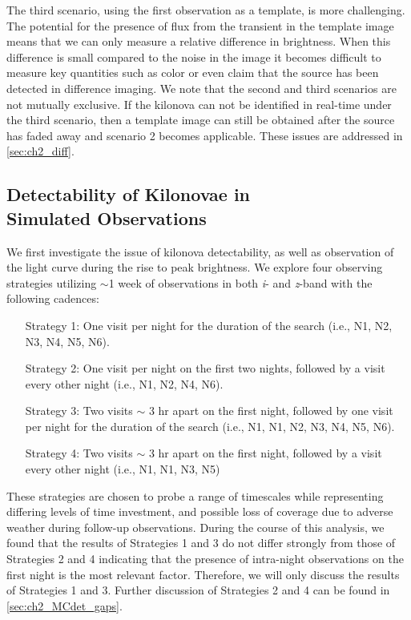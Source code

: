 The third scenario, using the first observation as a template, is more challenging. The potential for the presence of flux from the transient in the template image means that we can only measure a relative difference in brightness. When this difference is small compared to the noise in the image it becomes difficult to measure key quantities such as color or even claim that the source has been detected in difference imaging. We note that the second and third scenarios are not mutually exclusive. If the kilonova can not be identified in real-time under the third scenario, then a template image can still be obtained after the source has faded away and scenario 2 becomes applicable. These issues are addressed in \cref{sec:ch2_diff}.

\subsection{Detectability of Kilonovae in\\ Simulated Observations}
\label{sec:ch2_MCsims_det}
We first investigate the issue of kilonova detectability, as well as observation of the light curve during the rise to peak brightness. We explore four observing strategies utilizing $\sim$1 week of observations in both {\em i}- and {\em z}-band with the following cadences:
{\small \begin{enumerate}[leftmargin = 2.5cm]
\item[Strategy 1:] One visit per night for the duration of the search (i.e., N1, N2, N3, N4, N5, N6). 
\item[Strategy 2:]  One visit per night on the first two nights, followed by a visit every other night (i.e., N1, N2, N4, N6).
\item[Strategy 3:]  Two visits $\sim$ 3 hr apart on the first night, followed by one visit per night for the duration of the search (i.e., N1, N1, N2, N3, N4, N5, N6). 
\item[Strategy 4:]  Two visits $\sim$ 3 hr apart on the first night, followed by a visit every other night (i.e., N1, N1, N3, N5)
\end{enumerate}}
\noindent These strategies are chosen to probe a range of timescales while representing differing levels of time investment, and possible loss of coverage due to adverse weather during follow-up observations. During the course of this analysis, we found that the results of Strategies 1 and 3 do not differ strongly from those of Strategies 2 and 4 indicating that the presence of intra-night observations on the first night is the most relevant factor. Therefore, we will only discuss the results of Strategies 1 and 3. Further discussion of Strategies 2 and 4 can be found in \cref{sec:ch2_MCdet_gaps}.

